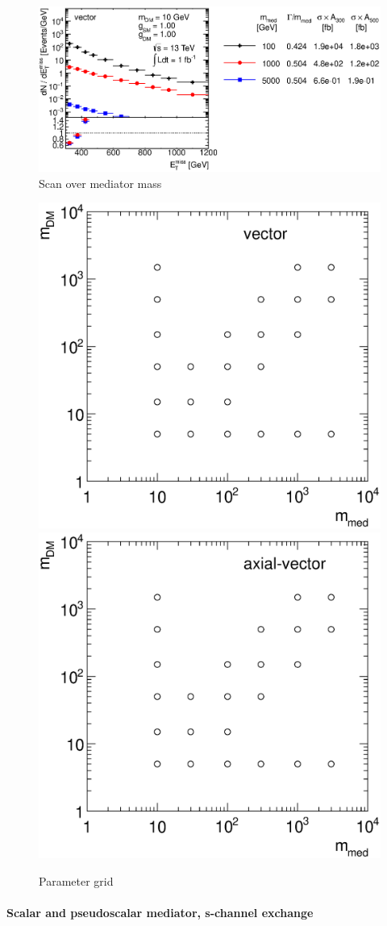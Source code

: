 \begin{figure}
\centering
\includegraphics[width=0.9\linewidth]{figures/monojet/scan_mMed_V_10.eps}
\caption{Scan over mediator mass}
\label{fig:monojet_scan_V_mMed}
\end{figure}

\begin{figure}
\centering
\includegraphics[width=0.45\linewidth]{figures/monojet/grid_V.eps}
\includegraphics[width=0.45\linewidth]{figures/monojet/grid_A.eps}
\caption{Parameter grid}
\label{fig:monojet_grid_V}
\end{figure}



\paragraph{Scalar and pseudoscalar mediator, s-channel exchange}


